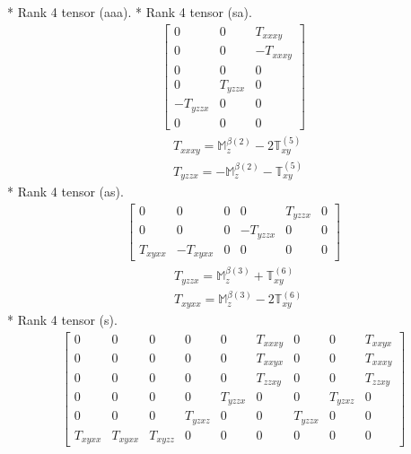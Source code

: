 \documentclass[fleqn,8pt,landscape]{jsarticle}
\begin{document}
* Rank 4 tensor (aaa).
* Rank 4 tensor (sa).
\begin{align*}
\begin{bmatrix} 0 & 0 & T_{xxxy} \\ 0 & 0 & - T_{xxxy} \\ 0 & 0 & 0 \\ 0 & T_{yzzx} & 0 \\ - T_{yzzx} & 0 & 0 \\ 0 & 0 & 0 \end{bmatrix}
\end{align*}
\begin{align*}
& T_{xxxy} = \mathbb{M}_{z}^{\beta(2)} - 2 \mathbb{T}_{xy}^{(5)} \\
& T_{yzzx} = - \mathbb{M}_{z}^{\beta(2)} - \mathbb{T}_{xy}^{(5)}
\end{align*}
* Rank 4 tensor (as).
\begin{align*}
\begin{bmatrix} 0 & 0 & 0 & 0 & T_{yzzx} & 0 \\ 0 & 0 & 0 & - T_{yzzx} & 0 & 0 \\ T_{xyxx} & - T_{xyxx} & 0 & 0 & 0 & 0 \end{bmatrix}
\end{align*}
\begin{align*}
& T_{yzzx} = \mathbb{M}_{z}^{\beta(3)} + \mathbb{T}_{xy}^{(6)} \\
& T_{xyxx} = \mathbb{M}_{z}^{\beta(3)} - 2 \mathbb{T}_{xy}^{(6)}
\end{align*}
* Rank 4 tensor (s).
\begin{align*}
\begin{bmatrix} 0 & 0 & 0 & 0 & 0 & T_{xxxy} & 0 & 0 & T_{xxyx} \\ 0 & 0 & 0 & 0 & 0 & T_{xxyx} & 0 & 0 & T_{xxxy} \\ 0 & 0 & 0 & 0 & 0 & T_{zzxy} & 0 & 0 & T_{zzxy} \\ 0 & 0 & 0 & 0 & T_{yzzx} & 0 & 0 & T_{yzxz} & 0 \\ 0 & 0 & 0 & T_{yzxz} & 0 & 0 & T_{yzzx} & 0 & 0 \\ T_{xyxx} & T_{xyxx} & T_{xyzz} & 0 & 0 & 0 & 0 & 0 & 0 \end{bmatrix}
\end{align*}
\end{document}
